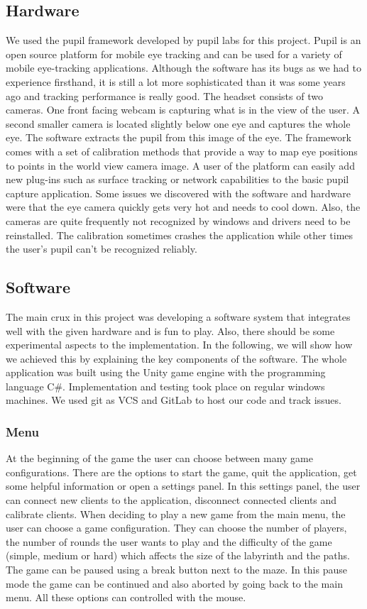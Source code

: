 \documentclass{sigchi}
\begin{document}
\subsection{Hardware}
We used the pupil framework developed by pupil labs \cite{kassner2014pupil} for this project. Pupil is an open source platform for mobile eye tracking and can be used for a variety of mobile eye-tracking applications. Although the software has its bugs as we had to experience firsthand, it is still a lot more sophisticated than it was some years ago and tracking performance is really good. The headset consists of two cameras. One front facing webcam is capturing what is in the view of the user. A second smaller camera is located slightly below one eye and captures the whole eye. The software extracts the pupil from this image of the eye. The framework comes with a set of calibration methods that provide a way to map eye positions to points in the world view camera image. A user of the platform can easily add new plug-ins such as surface tracking or network capabilities to the basic pupil capture application. Some issues we discovered with the software and hardware were that the eye camera quickly gets very hot and needs to cool down. Also, the cameras are quite frequently not recognized by windows and drivers need to be reinstalled. The calibration sometimes crashes the application while other times the user's pupil can't be recognized reliably.

\subsection{Software}
The main crux in this project was developing a software system that integrates well with the given hardware and is fun to play. Also, there should be some experimental aspects to the implementation. In the following, we will show how we achieved this by explaining the key components of the software. The whole application was built using the Unity game engine with the programming language C\#. Implementation and testing took place on regular windows machines. We used git as VCS and GitLab to host our code and track issues.

\subsubsection{Menu}
At the beginning of the game the user can choose between many game configurations. There are the options to start the game, quit the application, get some helpful information or open a settings panel. In this settings panel, the user can connect new clients to the application, disconnect connected clients and calibrate clients. When deciding to play a new game from the main menu, the user can choose a game configuration. They can choose the number of players, the number of rounds the user wants to play and the difficulty of the game (simple, medium or hard) which affects the size of the labyrinth and the paths. The game can be paused using a break button next to the maze. In this pause mode the game can be continued and also aborted by going back to the main menu. All these options can controlled with the mouse.
\end{document}
